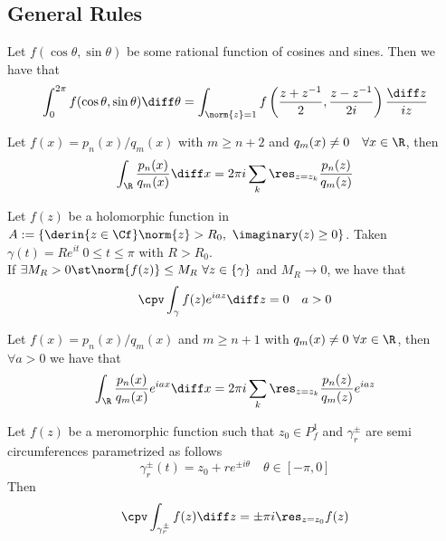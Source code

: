 \documentclass[../mmf.tex]{subfiles}
\begin{document}
\subsection{General Rules}
\begin{thm}
	Let $f(\cos\theta,\sin\theta)$ be some rational function of cosines and sines. Then we have that
	\begin{equation}
		\int_{0}^{2\pi}f(\cos\theta,\sin\theta)\diff\theta=\int_{\norm{z}=1}^{}f\left( \frac{z+z^{-1}}{2},\frac{z-z^{-1}}{2i} \right)\frac{\diff z}{iz}
		\label{eq:trigint}
	\end{equation}
\end{thm}
\begin{thm}
	Let $f(x)=p_n(x)/q_m(x)$ with $m\ge n+2$ and $q_m(x)\ne0\quad\forall x\in\R$, then
	\begin{equation}
		\int_{\R}^{}\frac{p_n(x)}{q_m(x)}\diff x=2\pi i\sum_{k}\res_{z=z_k}\frac{p_n(z)}{q_m(z)}
		\label{eq:rationalfunc}
	\end{equation}
\end{thm}
\begin{lem}
	Let $f(z)$ be a holomorphic function in $A:=\left\{ \derin{z\in\Cf}\norm{z}>R_0,\ \imaginary(z)\ge0 \right\}$. Taken $\gamma(t)=Re^{it}\ 0\le t\le\pi$ with $R>R_0$.\\
	If $\exists M_R>0\st\norm{f(z)}\le M_R\ \forall z\in\{\gamma\}$ and $M_R\to0$, we have that
	\begin{equation}
		\cpv\int_{\gamma}^{}f(z)e^{iaz}\diff z=0\quad a>0
		\label{eq:jordanlemma}
	\end{equation}
\end{lem}
\begin{thm}
	Let $f(x)=p_n(x)/q_m(x)$ and $m\ge n+1$ with $q_m(x)\ne0\ \forall x\in\R$, then $\forall a>0$ we have that
	\begin{equation}
		\int_{\R}^{}\frac{p_n(x)}{q_m(x)}e^{iax}\diff x=2\pi i\sum_k\res_{z=z_k}\frac{p_n(z)}{q_m(z)}e^{iaz}
		\label{eq:fracfourierint}
	\end{equation}
\end{thm}
\begin{lem}
	Let $f(z)$ be a meromorphic function such that $z_0\in P^1_f$ and $\gamma_r^{\pm}$ are semi circumferences parametrized as follows
	\begin{equation*}
		\gamma_r^{\pm}(t)=z_0+re^{\pm i\theta}\quad\theta\in[-\pi,0]
	\end{equation*}
	Then
	\begin{equation}
		\cpv\int_{\gamma_r^\pm}^{}f(z)\diff z=\pm\pi i\res_{z=z_0}f(z)
		\label{eq:singlesimplepole}
	\end{equation}
\end{lem}
\end{document}
